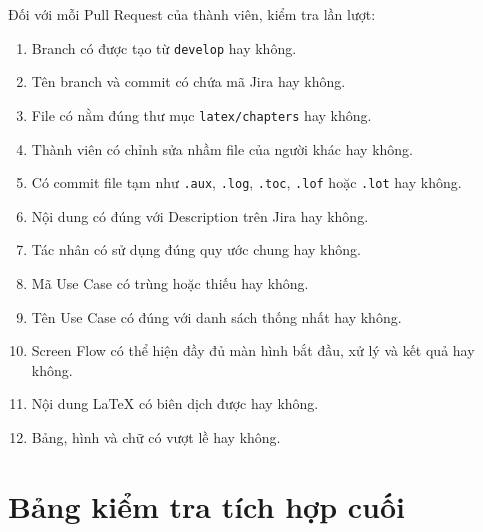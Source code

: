 \documentclass[12pt,a4paper]{article}
\begin{document}
	Đối với mỗi Pull Request của thành viên, kiểm tra lần lượt:
	
	\begin{enumerate}
		\item Branch có được tạo từ \texttt{develop} hay không.
		\item Tên branch và commit có chứa mã Jira hay không.
		\item File có nằm đúng thư mục \texttt{latex/chapters} hay không.
		\item Thành viên có chỉnh sửa nhầm file của người khác hay không.
		\item Có commit file tạm như \texttt{.aux}, \texttt{.log},
		\texttt{.toc}, \texttt{.lof} hoặc \texttt{.lot} hay không.
		\item Nội dung có đúng với Description trên Jira hay không.
		\item Tác nhân có sử dụng đúng quy ước chung hay không.
		\item Mã Use Case có trùng hoặc thiếu hay không.
		\item Tên Use Case có đúng với danh sách thống nhất hay không.
		\item Screen Flow có thể hiện đầy đủ màn hình bắt đầu,
		xử lý và kết quả hay không.
		\item Nội dung LaTeX có biên dịch được hay không.
		\item Bảng, hình và chữ có vượt lề hay không.
	\end{enumerate}
	
	\section{Bảng kiểm tra tích hợp cuối}
	
\end{document}
